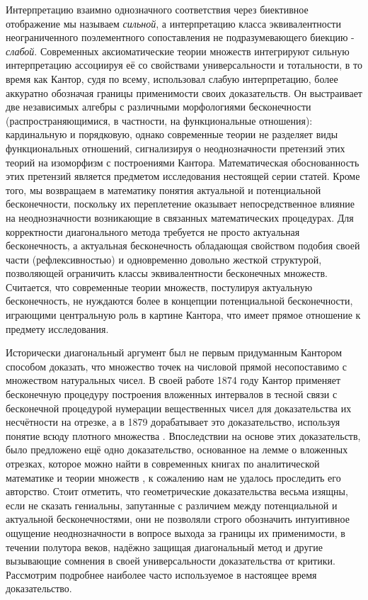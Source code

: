 \documentclass[12pt]{article}
\begin{document}
Интерпретацию взаимно однозначного соответствия через биективное отображение мы называем {\it сильной}, а интерпретацию класса эквивалентности неограниченного поэлементного сопоставления не подразумевающего биекцию - {\it слабой}. Современных аксиоматические теории множеств интегрируют сильную интерпретацию ассоциируя её со свойствами универсальности и тотальности, в то время как Кантор, судя по всему, использовал слабую интерпретацию, более аккуратно обозначая границы применимости своих доказательств. Он выстраивает две независимых алгебры с различными морфологиями бесконечности (распространяющимися, в частности, на функциональные отношения): кардинальную и порядковую, однако современные теории не разделяет виды функциональных отношений, сигнализируя о неоднозначности претензий этих теорий на изоморфизм с построениями Кантора. Математическая обоснованность этих претензий является предметом исследования нестоящей серии статей. Кроме того, мы возвращаем в математику понятия актуальной и потенциальной бесконечности, поскольку их переплетение оказывает непосредственное влияние на неоднозначности возникающие в связанных математических процедурах. Для корректности диагонального метода требуется не просто актуальная бесконечность, а актуальная бесконечность обладающая свойством подобия своей части (рефлексивностью) и одновременно довольно жесткой структурой, позволяющей ограничить классы эквивалентности бесконечных множеств. Считается, что современные теории множеств, постулируя актуальную бесконечность, не нуждаются более в концепции потенциальной бесконечности, играющими центральную роль в картине Кантора, что имеет прямое отношение к предмету исследования.

Исторически диагональный аргумент был не первым придуманным Кантором способом доказать, что множество точек на числовой прямой несопоставимо с множеством натуральных чисел. В своей работе 1874 году Кантор применяет бесконечную процедуру построения вложенных интервалов в тесной связи с бесконечной процедурой нумерации вещественных чисел \cite{interval} для доказательства их несчётности на отрезке, а в 1879 дорабатывает это доказательство, используя понятие всюду плотного множества \cite{interval-density}. Впоследствии на основе этих доказательств, было предложено ещё одно доказательство, основанное на лемме о вложенных отрезках, которое можно найти в современных книгах по аналитической математике и теории множеств \cite{matan-interval}, к сожалению нам не удалось проследить его авторство. Стоит отметить, что геометрические доказательства весьма изящны, если не сказать гениальны, запутанные с различием между потенциальной и актуальной бесконечностями, они не позволяли строго обозначить интуитивное ощущение неоднозначности в вопросе выхода за границы их применимости, в течении полутора веков, надёжно защищая диагональный метод и другие вызывающие сомнения в своей универсальности доказательства от критики. Рассмотрим подробнее наиболее часто используемое в настоящее время доказательство.
\end{document}
